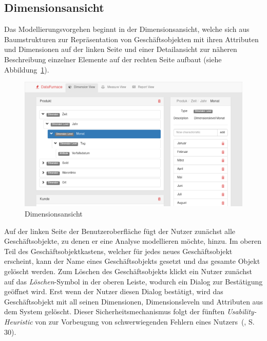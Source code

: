\documentclass[
  language=german, %
  type=bachelor,%
  ngerman
]{isthesis}
\begin{document}
\begin{content}
  \subsection{Dimensionsansicht}\label{subsec:dimensionsansicht}

  Das Modellierungsvorgehen beginnt in der Dimensionsansicht, welche sich aus
  Baumstrukturen zur Repräsentation von Geschäftsobjekten mit ihren Attributen
  und Dimensionen auf der linken Seite und einer Detailansicht zur näheren
  Beschreibung einzelner Elemente auf der rechten Seite aufbaut (siehe
  Abbildung~\ref{dimensionsansicht}). 

  \begin{figure}
    \includegraphics[scale=0.4]{content/figures/dimension-view.png}
    \caption{Dimensionsansicht}\label{dimensionsansicht}
  \end{figure}

  Auf der linken Seite der Benutzeroberfläche fügt der Nutzer zunächst alle
  Geschäftsobjekte, zu denen er eine Analyse modellieren möchte, hinzu. Im
  oberen Teil des Geschäftsobjektkastens, welcher für jedes neues Geschäftsobjekt erscheint, kann
  der Name eines Geschäftsobjekts gesetzt und das gesamte Objekt gelöscht
  werden. Zum Löschen des Geschäftsobjekts klickt ein Nutzer zunächst auf das
  \textit{Löschen}-Symbol in der oberen Leiste, wodurch ein Dialog zur
  Bestätigung geöffnet wird. Erst wenn der Nutzer diesen Dialog bestätigt, wird
  das Geschäftsobjekt mit all seinen Dimensionen, Dimensionsleveln und
  Attributen aus dem System gelöscht. Dieser Sicherheitsmechanismus folgt der
  fünften \textit{Usability-Heuristic} von
  \textsc{\citeauthor{nielsen1994heuristic}} zur Vorbeugung von schwerwiegenden
  Fehlern eines Nutzers~(\citeyear{nielsen1994heuristic}, S. 30).


\end{content}
\end{document}
